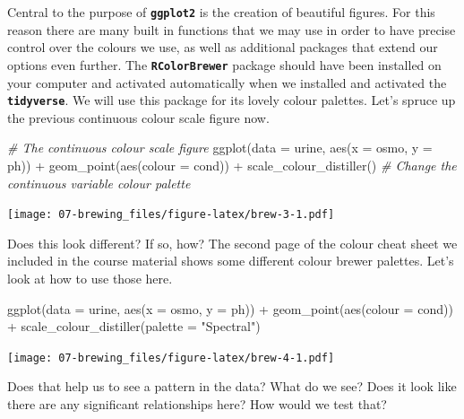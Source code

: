 \documentclass[
]{book}
\newenvironment{Shaded}{\begin{snugshade}}{\end{snugshade}}
\newcommand{\AttributeTok}[1]{\textcolor[rgb]{0.77,0.63,0.00}{#1}}
\newcommand{\CommentTok}[1]{\textcolor[rgb]{0.56,0.35,0.01}{\textit{#1}}}
\newcommand{\FunctionTok}[1]{\textcolor[rgb]{0.00,0.00,0.00}{#1}}
\newcommand{\NormalTok}[1]{#1}
\newcommand{\SpecialCharTok}[1]{\textcolor[rgb]{0.00,0.00,0.00}{#1}}
\newcommand{\StringTok}[1]{\textcolor[rgb]{0.31,0.60,0.02}{#1}}
\begin{document}
Central to the purpose of \textbf{\texttt{ggplot2}} is the creation of beautiful figures. For this reason there are many built in functions that we may use in order to have precise control over the colours we use, as well as additional packages that extend our options even further. The \textbf{\texttt{RColorBrewer}} package should have been installed on your computer and activated automatically when we installed and activated the \textbf{\texttt{tidyverse}}. We will use this package for its lovely colour palettes. Let's spruce up the previous continuous colour scale figure now.

\begin{Shaded}
\begin{Highlighting}[]
\CommentTok{\# The continuous colour scale figure}
\FunctionTok{ggplot}\NormalTok{(}\AttributeTok{data =}\NormalTok{ urine, }\FunctionTok{aes}\NormalTok{(}\AttributeTok{x =}\NormalTok{ osmo, }\AttributeTok{y =}\NormalTok{ ph)) }\SpecialCharTok{+}
  \FunctionTok{geom\_point}\NormalTok{(}\FunctionTok{aes}\NormalTok{(}\AttributeTok{colour =}\NormalTok{ cond)) }\SpecialCharTok{+}
  \FunctionTok{scale\_colour\_distiller}\NormalTok{() }\CommentTok{\# Change the continuous variable colour palette}
\end{Highlighting}
\end{Shaded}

\texttt{[image: 07-brewing\_files/figure-latex/brew-3-1.pdf]}

Does this look different? If so, how? The second page of the colour cheat sheet we included in the course material shows some different colour brewer palettes. Let's look at how to use those here.

\begin{Shaded}
\begin{Highlighting}[]
\FunctionTok{ggplot}\NormalTok{(}\AttributeTok{data =}\NormalTok{ urine, }\FunctionTok{aes}\NormalTok{(}\AttributeTok{x =}\NormalTok{ osmo, }\AttributeTok{y =}\NormalTok{ ph)) }\SpecialCharTok{+}
  \FunctionTok{geom\_point}\NormalTok{(}\FunctionTok{aes}\NormalTok{(}\AttributeTok{colour =}\NormalTok{ cond)) }\SpecialCharTok{+}
  \FunctionTok{scale\_colour\_distiller}\NormalTok{(}\AttributeTok{palette =} \StringTok{"Spectral"}\NormalTok{)}
\end{Highlighting}
\end{Shaded}

\texttt{[image: 07-brewing\_files/figure-latex/brew-4-1.pdf]}

Does that help us to see a pattern in the data? What do we see? Does it look like there are any significant relationships here? How would we test that?
\end{document}
